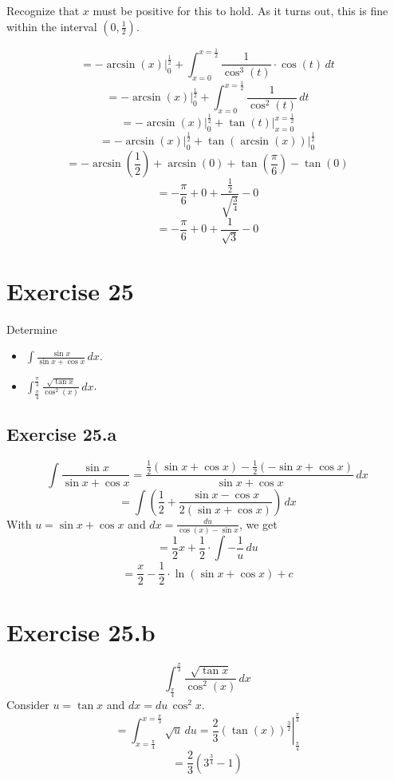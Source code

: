 \documentclass[a4paper]{article}
\theoremstyle{definition}
\begin{document}
Recognize that $x$ must be positive for this to hold. As it turns out,
this is fine within the interval $(0, \frac12)$.

\[
  = \left. -\arcsin(x) \right|_0^{\frac12}
  + \int_{x=0}^{x = \frac12} \frac{1}{\cos^3(t)} \cdot \cos(t) \, dt
\] \[
  = \left. -\arcsin(x) \right|_0^{\frac12}
  + \int_{x=0}^{x = \frac12} \frac{1}{\cos^2(t)} \, dt
\] \[
  = \left. -\arcsin(x) \right|_0^{\frac12}
  + \left. \tan(t) \right|_{x=0}^{x=\frac12}
\] \[
  = \left. -\arcsin(x) \right|_0^{\frac12}
  + \left. \tan(\arcsin(x))  \right|_0^{\frac12}
\] \[
  = -\arcsin\left(\frac12\right) + \arcsin(0) + \tan\left(\frac\pi6\right) - \tan(0)
\] \[
  = -\frac\pi6 + 0 + \frac{\frac12}{\sqrt{\frac34}} - 0
\] \[
  = -\frac\pi6 + 0 + \frac1{\sqrt{3}} - 0
\]

\section{Exercise 25}
\begin{ex}
  Determine
  \begin{itemize}
    \item $\int \frac{\sin{x}}{\sin{x} + \cos{x}} \, dx$.
    \item $\int_{\frac\pi4}^{\frac\pi3} \frac{\sqrt{\tan{x}}}{\cos^2(x)} \, dx$.
  \end{itemize}
\end{ex}

\subsection{Exercise 25.a}
\[
  \int \frac{\sin{x}}{\sin{x} + \cos{x}}
    = \frac{\frac12 \left(\sin{x} + \cos{x}\right) - \frac12 \left(-\sin{x} + \cos{x}\right)}{\sin{x} + \cos{x}} \, dx
\] \[
  = \int \left(\frac12 + \frac{\sin{x} - \cos{x}}{2 (\sin{x} + \cos{x})}\right) \, dx
\]
With $u = \sin{x} + \cos{x}$ and $dx = \frac{du}{\cos(x) - \sin{x}}$, we get
\[ = \frac12 x + \frac12 \cdot \int -\frac{1}{u} \, du \]
\[ = \frac x2 - \frac12 \cdot \ln(\sin{x} + \cos{x}) + c \]

\section{Exercise 25.b}
\[
  \int_{\frac\pi4}^{\frac\pi3} \frac{\sqrt{\tan{x}}}{\cos^2(x)} \, dx
\]
Consider $u = \tan{x}$ and $dx = du \, \cos^2{x}$.
\[
  = \int_{x=\frac{\pi}{4}}^{x = \frac\pi3} \sqrt{u} \, du
  = \left. \frac23 (\tan(x))^{\frac32} \right|_{\frac\pi4}^{\frac\pi3}
\] \[
  = \frac23 \left(3^{\frac34} - 1\right)
\]
\end{document}

